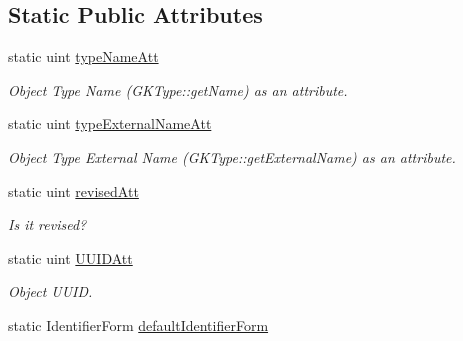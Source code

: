 \subsection*{Static Public Attributes}
\begin{DoxyCompactItemize}
\item 
static uint \hyperlink{classGKObject_a62b7b0bca4a499a99b706c07d7401599}{type\+Name\+Att}\hypertarget{classGKObject_a62b7b0bca4a499a99b706c07d7401599}{}\label{classGKObject_a62b7b0bca4a499a99b706c07d7401599}

\begin{DoxyCompactList}\small\item\em Object Type Name (G\+K\+Type\+::get\+Name) as an attribute. \end{DoxyCompactList}\item 
static uint \hyperlink{classGKObject_a4bb1a006385999d0ee85a952b77b1579}{type\+External\+Name\+Att}\hypertarget{classGKObject_a4bb1a006385999d0ee85a952b77b1579}{}\label{classGKObject_a4bb1a006385999d0ee85a952b77b1579}

\begin{DoxyCompactList}\small\item\em Object Type External Name (G\+K\+Type\+::get\+External\+Name) as an attribute. \end{DoxyCompactList}\item 
static uint \hyperlink{classGKObject_a2ce21377a60b11eb561b014d5116d194}{revised\+Att}\hypertarget{classGKObject_a2ce21377a60b11eb561b014d5116d194}{}\label{classGKObject_a2ce21377a60b11eb561b014d5116d194}

\begin{DoxyCompactList}\small\item\em Is it revised? \end{DoxyCompactList}\item 
static uint \hyperlink{classGKObject_a2d3c15945adc711cd10a0e0cffa85ce3}{U\+U\+I\+D\+Att}\hypertarget{classGKObject_a2d3c15945adc711cd10a0e0cffa85ce3}{}\label{classGKObject_a2d3c15945adc711cd10a0e0cffa85ce3}

\begin{DoxyCompactList}\small\item\em Object U\+U\+ID. \end{DoxyCompactList}\item 
static Identifier\+Form \hyperlink{classGKObject_a9db2ffda1c05ae007ad8dd5cf95e452f}{default\+Identifier\+Form}
\end{DoxyCompactItemize}
